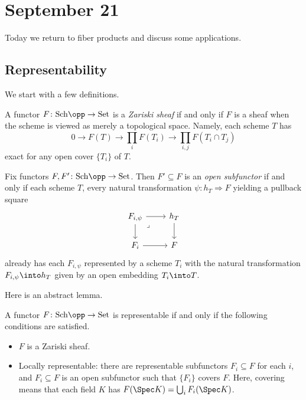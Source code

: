 \documentclass[../notes.tex]{subfiles}
\begin{document}
\section{September 21}

Today we return to fiber products and discuss some applications.

\subsection{Representability}
We start with a few definitions.
\begin{definition}
	A functor $F\colon\mathrm{Sch}\opp\to\mathrm{Set}$ is a \textit{Zariski sheaf} if and only if $F$ is a sheaf when the scheme is viewed as merely a topological space. Namely, each scheme $T$ has
	\[0\to F(T)\to\prod_iF(T_i)\to\prod_{i,j}F(T_i\cap T_j)\]
	exact for any open cover $\{T_i\}$ of $T$.
\end{definition}
\begin{definition}
	Fix functors $F,F'\colon\mathrm{Sch}\opp\to\mathrm{Set}$. Then $F'\subseteq F$ is an \textit{open subfunctor} if and only if each scheme $T$, every natural transformation $\psi\colon h_T\Rightarrow F$ yielding a pullback square
	\[\begin{tikzcd}
		{F_{i,\psi}} & {h_T} \\
		{F_i} & F
		\arrow[from=1-1, to=1-2]
		\arrow[from=2-1, to=2-2]
		\arrow[from=1-1, to=2-1]
		\arrow[from=1-2, to=2-2]
		\arrow["\lrcorner"{anchor=center, pos=0.125}, draw=none, from=1-1, to=2-2]
	\end{tikzcd}\]
	already has each $F_{i,\psi}$ represented by a scheme $T_i$ with the natural transformation $F_{i,\psi}\into h_T$ given by an open embedding $T_i\into T$.
\end{definition}
Here is an abstract lemma.
\begin{lemma} \label{lem:abstract-repr}
	A functor $F\colon\mathrm{Sch}\opp\to\mathrm{Set}$ is representable if and only if the following conditions are satisfied.
	\begin{itemize}
		\item $F$ is a Zariski sheaf.
		\item Locally representable: there are representable subfunctors $F_i\subseteq F$ for each $i$, and $F_i\subseteq F$ is an open subfunctor such that $\{F_i\}$ covers $F$. Here, covering means that each field $K$ has $F(\Spec K)=\bigcup_iF_i(\Spec K)$.
	\end{itemize}
\end{lemma}
\end{document}
